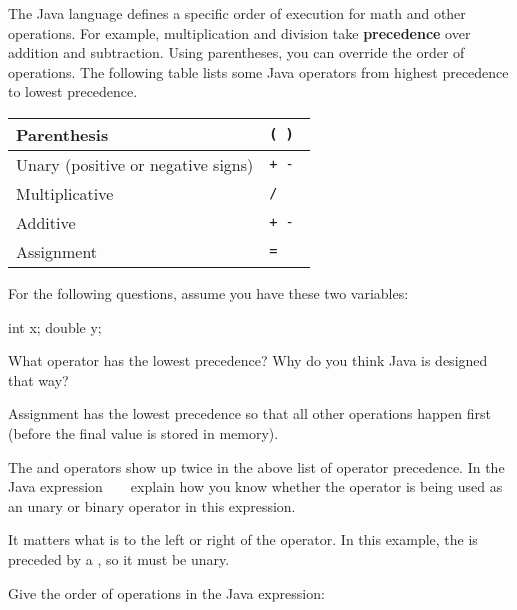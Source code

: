 

The Java language defines a specific order of execution for math and other operations. For example, multiplication and division take \textbf{precedence} over addition and subtraction. Using parentheses, you can override the order of operations.
The following table lists some Java operators from highest precedence to lowest precedence.

\begin{center}
\begin{tabular}{|L{3in}|L{1in}|}
\hline
Parenthesis
& \tt ( ) \\
\hline
Unary (positive or negative signs)
& \tt + - \\
\hline
Multiplicative
& \tt * / \\
\hline
Additive
& \tt + - \\
\hline
Assignment
& \tt = \\
\hline
\end{tabular}
\end{center}

For the following questions, assume you have these two variables:

\begin{javalst}
    int x;
    double y;
\end{javalst}




\Q What operator has the lowest precedence?
Why do you think Java is designed that way?

\begin{answer}
Assignment has the lowest precedence so that all other operations happen first (before the final value is stored in memory).
\end{answer}


\Q The \java{+} and \java{-} operators show up twice in the above list of operator precedence.
In the Java expression ~  ~ explain how you know whether the \java{-} operator is being used as an unary or binary operator in this expression.

\begin{answer}
It matters what is to the left or right of the operator.
In this example, the \java{-} is preceded by a \java{*}, so it must be unary.
\end{answer}


\Q Give the order of operations in the Java expression: ~ 

